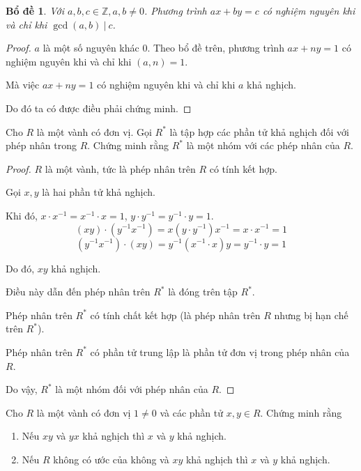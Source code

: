 \documentclass[class=linearalgebra,crop=false]{standalone}
\newtheorem{lemma}{Bổ đề}
\begin{document}
\begin{lemma}Với $a, b, c \in \mathbb{Z}, a, b\ne 0$. Phương trình $ax + by = c$ có nghiệm nguyên khi và chỉ khi $\gcd(a, b)\ |\ c$.
\end{lemma}

\begin{proof}$a$ là một số nguyên khác $0$. Theo bổ đề trên, phương trình $ax + ny = 1$ có nghiệm nguyên khi và chỉ khi $(a, n) = 1$.
    \par Mà việc $ax + ny = 1$ có nghiệm nguyên khi và chỉ khi $a$ khả nghịch.
    \par Do đó ta có được điều phải chứng minh.
\end{proof}

\begin{exercise}Cho $R$ là một vành có đơn vị. Gọi $R^{*}$ là tập hợp các phần tử khả nghịch đối với phép nhân trong $R$. Chứng minh rằng $R^{*}$ là một nhóm với các phép nhân của $R$.
\end{exercise}

\begin{proof}$R$ là một vành, tức là phép nhân trên $R$ có tính kết hợp.
    \par Gọi $x, y$ là hai phần tử khả nghịch.
    \par Khi đó, $x\cdot x^{-1} = x^{-1}\cdot x = 1$, $y\cdot y^{-1} = y^{-1}\cdot y = 1$.
    \[ (xy)\cdot (y^{-1}x^{-1}) = x(y\cdot y^{-1})x^{-1} = x\cdot x^{-1} = 1 \]
    \[ (y^{-1}x^{-1})\cdot (xy) = y^{-1}(x^{-1}\cdot x)y = y^{-1}\cdot y = 1 \]
    \par Do đó, $xy$ khả nghịch.

    \par Điều này dẫn đến phép nhân trên $R^{*}$ là đóng trên tập $R^{*}$.
    \par Phép nhân trên $R^{*}$ có tính chất kết hợp (là phép nhân trên $R$ nhưng bị hạn chế trên $R^{*}$).
    \par Phép nhân trên $R^{*}$ có phần tử trung lập là phần tử đơn vị trong phép nhân của $R$.
    \par Do vậy, $R^{*}$ là một nhóm đối với phép nhân của $R$.
\end{proof}

\begin{exercise}Cho $R$ là một vành có đơn vị $1\ne 0$ và các phần tử $x, y\in R$. Chứng minh rằng
    \begin{enumerate}[label = (\alph*)]
        \item Nếu $xy$ và $yx$ khả nghịch thì $x$ và $y$ khả nghịch.
        \item Nếu $R$ không có ước của không và $xy$ khả nghịch thì $x$ và $y$ khả nghịch.
    \end{enumerate}
\end{exercise}
\end{document}
